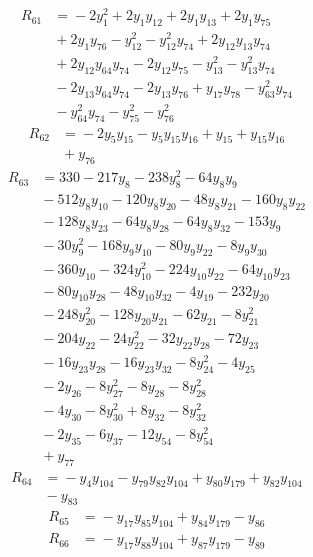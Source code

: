 \begin{align*}
R_{61} &={} -2y_{1}^{2} +2y_{1}y_{12} +2y_{1}y_{13} +2y_{1}y_{75} \\
 &{} +2y_{1}y_{76} -y_{12}^{2} -y_{12}^{2}y_{74} +2y_{12}y_{13}y_{74} \\
 &{} +2y_{12}y_{64}y_{74} -2y_{12}y_{75} -y_{13}^{2} -y_{13}^{2}y_{74} \\
 &{} -2y_{13}y_{64}y_{74} -2y_{13}y_{76} +y_{17}y_{78} -y_{63}^{2}y_{74} \\
 &{} -y_{64}^{2}y_{74} -y_{75}^{2} -y_{76}^{2}
\end{align*}
\begin{align*}
R_{62} &={} -2y_{5}y_{15} -y_{5}y_{15}y_{16} +y_{15} +y_{15}y_{16} \\
 &{} +y_{76}
\end{align*}
\begin{align*}
R_{63} &={} 330 -217y_{8} -238y_{8}^{2} -64y_{8}y_{9} \\
 &{} -512y_{8}y_{10} -120y_{8}y_{20} -48y_{8}y_{21} -160y_{8}y_{22} \\
 &{} -128y_{8}y_{23} -64y_{8}y_{28} -64y_{8}y_{32} -153y_{9} \\
 &{} -30y_{9}^{2} -168y_{9}y_{10} -80y_{9}y_{22} -8y_{9}y_{30} \\
 &{} -360y_{10} -324y_{10}^{2} -224y_{10}y_{22} -64y_{10}y_{23} \\
 &{} -80y_{10}y_{28} -48y_{10}y_{32} -4y_{19} -232y_{20} \\
 &{} -248y_{20}^{2} -128y_{20}y_{21} -62y_{21} -8y_{21}^{2} \\
 &{} -204y_{22} -24y_{22}^{2} -32y_{22}y_{28} -72y_{23} \\
 &{} -16y_{23}y_{28} -16y_{23}y_{32} -8y_{24}^{2} -4y_{25} \\
 &{} -2y_{26} -8y_{27}^{2} -8y_{28} -8y_{28}^{2} \\
 &{} -4y_{30} -8y_{30}^{2} +8y_{32} -8y_{32}^{2} \\
 &{} -2y_{35} -6y_{37} -12y_{54} -8y_{54}^{2} \\
 &{} +y_{77}
\end{align*}
\begin{align*}
R_{64} &={} -y_{4}y_{104} -y_{79}y_{82}y_{104} +y_{80}y_{179} +y_{82}y_{104} \\
 &{} -y_{83}
\end{align*}
\begin{align*}
R_{65} &={} -y_{17}y_{85}y_{104} +y_{84}y_{179} -y_{86}
\end{align*}
\begin{align*}
R_{66} &={} -y_{17}y_{88}y_{104} +y_{87}y_{179} -y_{89}
\end{align*}
